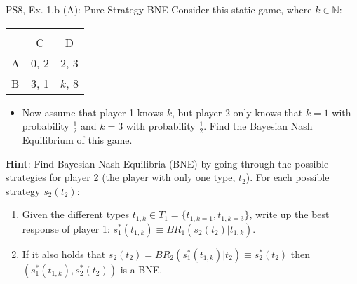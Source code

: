\begin{frame}{PS8, Ex. 1.b (A): Pure-Strategy BNE}
    Consider this static game, where $k\in\mathbb{N}:$
    \vspace{-16pt}
    \begin{table}
      \begin{tabular}{l|c|c|}
        \multicolumn{1}{c}{} & \multicolumn{2}{c}{} \\
        \multicolumn{1}{c}{} & \multicolumn{1}{c}{C} & \multicolumn{1}{c}{D} \\\cline{2-3}
        A & 0, 2 & 2, 3 \\\cline{2-3}
        B & 3, 1 & $k$, 8 \\\cline{2-3}
      \end{tabular}
    \end{table}
    \vspace{-4pt}
    \begin{itemize}
      \item[(b)] Now assume that player 1 knows $k$, but player 2 only knows that $k = 1$ with probability $\frac{1}{2}$ and $k = 3$ with probability $\frac{1}{2}$. Find the Bayesian Nash Equilibrium of this game.
    \end{itemize}
    \vspace{-4pt}
    \begin{multicols}{2}
      \textbf{Hint}: Find Bayesian Nash Equilibria (BNE) by going through the possible strategies for player 2 (the player with only one type, $t_2$). For each possible strategy $s_2(t_2)$:
      \vspace{-4pt}
      \begin{enumerate}\normalsize
        \item[Step 1:] Given the different types $t_{1,k}\in T_1=\{t_{1,k=1},t_{1,k=3}\}$, write up the best response of player 1: $s_1^*(t_{1,k})\equiv BR_1\left(s_2(t_2)|t_{1,k}\right)$.
        \item[Step 2:] If it also holds that $s_2(t_2)=BR_2\left(s_1^*(t_{1,k})|t_2\right)\equiv s_2^*(t_2)$ then $\left(s_1^*(t_{1,k}),s_2^*(t_2)\right)$ is a BNE.
      \end{enumerate}
      \vfill\null\columnbreak
      \vfill\null
    \end{multicols}
\end{frame}
